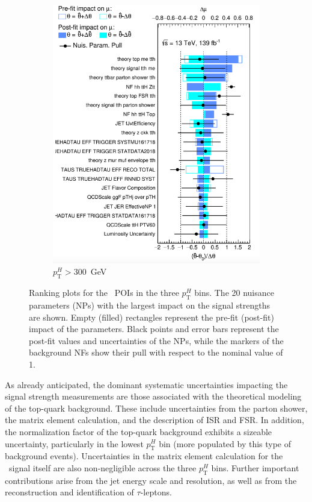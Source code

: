 \begin{figure}[htbp]
  \vspace{0.4cm}
  \begin{subfigure}[b]{0.45\textwidth}
    \centering
    \includegraphics[width=\linewidth]{images/fit_stxs/Ranking_r_11_ttH_ptH_gt300.png}
    \caption{\small $p_{\text{T}}^{H}>300$~GeV}
    \label{fig:ranking_tth_ptH_gt300}
  \end{subfigure}

  \caption{Ranking plots for the \ttH\ POIs in the three $p_{\text{T}}^{H}$ bins.
  The 20 nuisance parameters (NPs) with the largest impact on the signal strengths are shown. 
  Empty (filled) rectangles represent the pre-fit (post-fit) impact of the parameters. 
  Black points and error bars represent the post-fit values and uncertainties of the NPs, 
  while the markers of the background NFs show their pull with respect to the nominal value of 1.}
  \label{fig:ranking_tth_bins}
\end{figure}

As already anticipated, the dominant systematic uncertainties impacting the signal strength measurements are those associated with the theoretical modeling of the top-quark background. 
These include uncertainties from the parton shower, the matrix element calculation, and the description of ISR and FSR. 
In addition, the normalization factor of the top-quark background exhibits a sizeable uncertainty, particularly in the lowest $p_{\text{T}}^{H}$ bin (more populated by this type of background events). 
Uncertainties in the matrix element calculation for the \ttH\ signal itself are also non-negligible across the three $p_{\text{T}}^{H}$ bins. 
Further important contributions arise from the jet energy scale and resolution, as well as from the reconstruction and identification of $\tau$-leptons.
